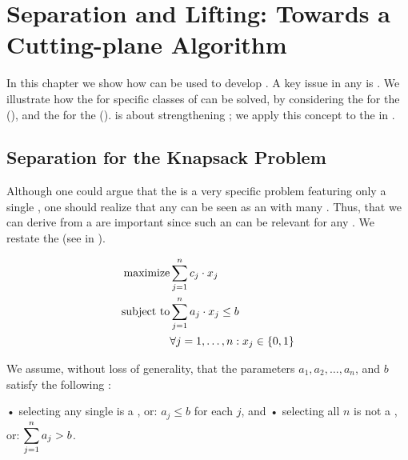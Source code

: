 \chapter{Separation and Lifting: Towards a Cutting-plane Algorithm}
In this chapter we show how  can be used to develop . A key issue in any  is . We illustrate how the  for specific classes of  can be solved, by considering the  for the  (), and the  for the  ().  is about strengthening ; we apply this concept to the  in .

\section{Separation for the Knapsack Problem}
Although one could argue that the  is a very specific problem featuring only a single , one should realize that any  can be seen as an  with many . Thus,  that we can derive from a  are important since such an  can be relevant for any . We restate the  (see  in ).

\begin{eqnarray}
\mbox{maximize}&\sumieqb[j]{1}{n}{c_j\cdot x_j}\eqnlab{knapsack4-m}\\
\mbox{subject to}&\sumieqb[j]{1}{n}{a_j\cdot x_j}\leq b\eqnlab{knapsack4-c1}\\
&\forall\rangei[j]{1}{n}:x_j\in\accl{0,1}\eqnlab{knapsack4-c2}
\end{eqnarray}

We assume, without loss of generality, that the parameters $a_1,a_2,\ldots,a_n$, and $b$ satisfy the following :

\begin{enumerate}
• selecting any single  is a , or: $a_j\leq b$ for each $j$, and
• selecting all $n$  is not a , or: $\sumieqb[j]{1}{n}{a_j}>b$.
\end{enumerate}

